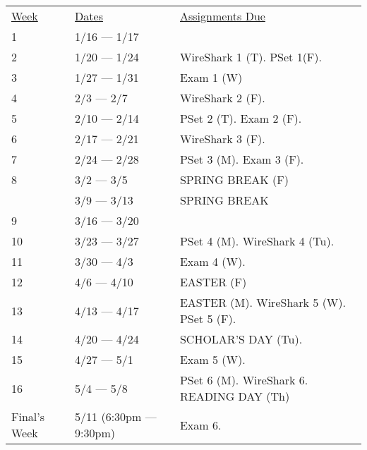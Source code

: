 \documentclass[10pt]{article}
\begin{document}
\begin{center}
\begin{tabular}{lll}
\underline{Week} & \underline{Dates} & \underline{Assignments Due}  \\
1 & 1/16 --- 1/17 &  \\
2 & 1/20 --- 1/24 & WireShark 1 (T). PSet 1(F). \\
3 & 1/27 --- 1/31 & Exam 1 (W)  \\
4 & 2/3 --- 2/7 & WireShark 2 (F).\\
5 & 2/10 --- 2/14 &  PSet 2 (T). Exam 2 (F). \\
6 & 2/17 --- 2/21 & WireShark 3 (F).  \\
7 & 2/24 --- 2/28 &  PSet 3 (M). Exam 3 (F).   \\
8 & 3/2 --- 3/5 & SPRING BREAK (F) \\
  & 3/9 --- 3/13 &  SPRING BREAK \\
9 & 3/16 --- 3/20 &   \\
10 & 3/23 --- 3/27 & PSet 4 (M). WireShark 4 (Tu).    \\
11 & 3/30 --- 4/3 &  Exam 4 (W).   \\
12 & 4/6 --- 4/10 &  EASTER (F) \\
13 & 4/13 --- 4/17 & EASTER (M). WireShark 5 (W). PSet 5 (F). \\
14 & 4/20 --- 4/24 & SCHOLAR'S DAY (Tu).     \\
15 & 4/27 --- 5/1 & Exam 5 (W).  \\
16 & 5/4 --- 5/8 & PSet 6 (M). WireShark 6. READING DAY (Th)  \\
Final's Week & 5/11 (6:30pm --- 9:30pm) & Exam 6.    \\
\end{tabular}
\end{center}
\end{document}
